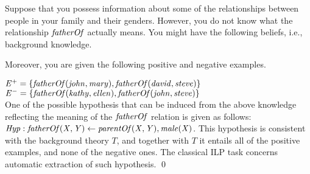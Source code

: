 \begin{example}
\label{ex:ilp}
Suppose that you possess information about some of the relationships between people in your family and their genders.
However, you do not know what the relationship $\mathit{fatherOf}$ actually means. 
You might have the following beliefs, i.e., background knowledge.
\smallskip

{}
\smallskip

Moreover, you are given the following positive and negative examples.
\smallskip

\noindent $\mathit{E^+=\{fatherOf(john, mary), fatherOf(david, steve)\}}$\\
$\mathit{E^-=\{fatherOf(kathy, ellen), fatherOf(john, steve)\}}$\\

One of the possible hypothesis that can be induced from the above knowledge reflecting the meaning of the $\mathit{fatherOf}$ relation is given as follows:\\
$\mathit{Hyp: fatherOf(X, Y)\leftarrow parentOf(X,Y), male(X)}$. This hypothesis is consistent with the background theory $T$, and together with $T$ it entails all of the positive examples, and none of the negative ones. %
The classical ILP task concerns automatic extraction of such hypothesis. \qed
\end{example}

